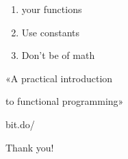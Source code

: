 \documentclass[aspectratio=169]{beamer}
\begin{document}
\begin{frame}
    \centering
\end{frame}

\begin{frame}
    \Huge
        \begin{enumerate}[ leftmargin=1.5em
                         , itemsep=1em
                         , labelsep=0.5em
                         , label=\color{darkelectricblue}\Roman*
                         ]
            \item {} your functions
            \item Use  constants
            \item Don't be  of math
        \end{enumerate}
\end{frame}

\begin{frame}
    \centering
\end{frame}

\begin{frame}
    \Huge{«A practical introduction}

    \Huge{\hspace{0.59em}to functional programming»}

    \vspace{1em}

    \Huge{bit.do/}
\end{frame}

\begin{frame}
    \centering
        \Huge{Thank you!}

\end{frame}
\end{document}
